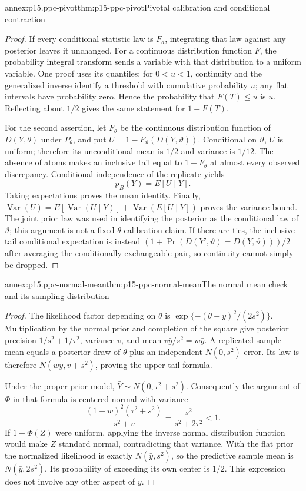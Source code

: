 \begin{annexitem}{annex:p15.ppc-pivot}{thm:p15-ppc-pivot}{Pivotal calibration and conditional contraction}
\begin{proof}
If every conditional statistic law is \(F_a\), integrating that law
against any posterior leaves it unchanged. For a continuous distribution
function \(F\), the probability integral transform sends a variable
with that distribution to a uniform variable. One proof uses its quantiles:
for \(0<u<1\), continuity and the generalized inverse identify a
threshold with cumulative probability \(u\); any flat intervals have
probability zero. Hence the probability that \(F(T)\leq u\) is \(u\).
Reflecting about \(1/2\) gives the same statement for \(1-F(T)\).

For the second assertion, let \(F_\theta\) be the continuous
distribution function of \(D(Y,\theta)\) under \(P_\theta\), and put
\(U=1-F_\vartheta(D(Y,\vartheta))\). Conditional on \(\vartheta\), \(U\)
is uniform; therefore its unconditional mean is \(1/2\) and variance
is \(1/12\). The absence of atoms makes an inclusive tail equal to
\(1-F_\theta\) at almost every observed discrepancy. Conditional
independence of the replicate yields
\[
 p_B(Y)=E[U\mid Y].
\]
Taking expectations proves the mean identity. Finally,
\(\operatorname{Var}(U)=E[\operatorname{Var}(U\mid Y)]
+\operatorname{Var}(E[U\mid Y])\) proves the variance bound.
The joint prior law was used in identifying the posterior as the conditional
law of \(\vartheta\); this argument is not a fixed-\(\theta\) calibration
claim. If there are ties, the inclusive-tail conditional expectation is
instead \((1+\Pr(D(Y',\vartheta)=D(Y,\vartheta)))/2\) after averaging
the conditionally exchangeable pair, so continuity cannot simply be dropped.
\end{proof}
\end{annexitem}

\begin{annexitem}{annex:p15.ppc-normal-mean}{thm:p15-ppc-normal-mean}{The normal mean check and its sampling distribution}
\begin{proof}
The likelihood factor depending on \(\theta\) is
\(\exp\{-(\theta-\bar y)^2/(2s^2)\}\). Multiplication by the
normal prior and completion of the square give posterior precision
\(1/s^2+1/\tau^2\), variance \(v\), and mean \(v\bar y/s^2=w\bar y\).
A replicated sample mean equals a posterior draw of \(\theta\) plus
an independent \(N(0,s^2)\) error. Its law is therefore
\(N(w\bar y,v+s^2)\), proving the upper-tail formula.

Under the proper prior model, \(\bar Y\sim N(0,\tau^2+s^2)\).
Consequently the argument of \(\Phi\) in that formula is centered
normal with variance
\[
 \frac{(1-w)^2(\tau^2+s^2)}{s^2+v}
 =\frac{s^2}{s^2+2\tau^2}<1.
\]
If \(1-\Phi(Z)\) were uniform, applying the inverse normal distribution
function would make \(Z\) standard normal, contradicting that variance.
With the flat prior the normalized likelihood is exactly
\(N(\bar y,s^2)\), so the predictive sample mean is
\(N(\bar y,2s^2)\). Its probability of exceeding its own center is
\(1/2\). This expression does not involve any other aspect of \(y\).
\end{proof}
\end{annexitem}

